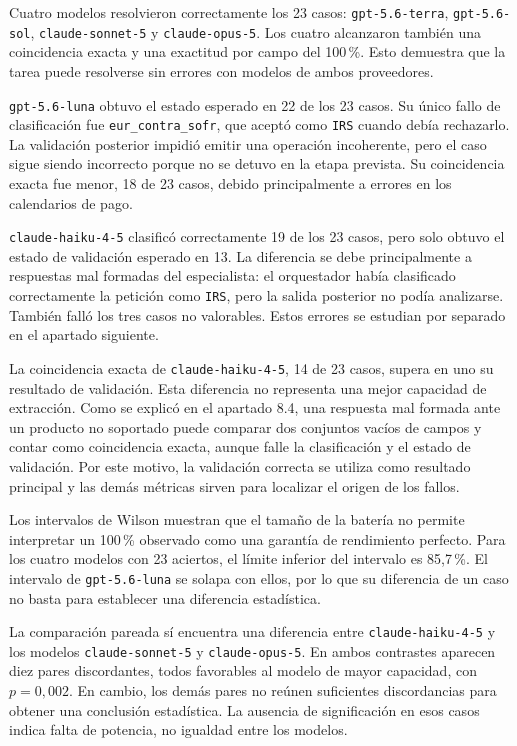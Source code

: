 Cuatro modelos resolvieron correctamente los 23 casos: \texttt{gpt-5.6-terra}, \texttt{gpt-5.6-sol}, \texttt{claude-sonnet-5} y \texttt{claude-opus-5}. Los cuatro alcanzaron también una coincidencia exacta y una exactitud por campo del 100\,\%. Esto demuestra que la tarea puede resolverse sin errores con modelos de ambos proveedores.

\texttt{gpt-5.6-luna} obtuvo el estado esperado en 22 de los 23 casos. Su único fallo de clasificación fue \texttt{eur\_contra\_sofr}, que aceptó como \texttt{IRS} cuando debía rechazarlo. La validación posterior impidió emitir una operación incoherente, pero el caso sigue siendo incorrecto porque no se detuvo en la etapa prevista. Su coincidencia exacta fue menor, 18 de 23 casos, debido principalmente a errores en los calendarios de pago.

\texttt{claude-haiku-4-5} clasificó correctamente 19 de los 23 casos, pero solo obtuvo el estado de validación esperado en 13. La diferencia se debe principalmente a respuestas mal formadas del especialista: el orquestador había clasificado correctamente la petición como \texttt{IRS}, pero la salida posterior no podía analizarse. También falló los tres casos no valorables. Estos errores se estudian por separado en el apartado siguiente.

La coincidencia exacta de \texttt{claude-haiku-4-5}, 14 de 23 casos, supera en uno su resultado de validación. Esta diferencia no representa una mejor capacidad de extracción. Como se explicó en el apartado 8.4, una respuesta mal formada ante un producto no soportado puede comparar dos conjuntos vacíos de campos y contar como coincidencia exacta, aunque falle la clasificación y el estado de validación. Por este motivo, la validación correcta se utiliza como resultado principal y las demás métricas sirven para localizar el origen de los fallos.

Los intervalos de Wilson muestran que el tamaño de la batería no permite interpretar un 100\,\% observado como una garantía de rendimiento perfecto. Para los cuatro modelos con 23 aciertos, el límite inferior del intervalo es 85,7\,\%. El intervalo de \texttt{gpt-5.6-luna} se solapa con ellos, por lo que su diferencia de un caso no basta para establecer una diferencia estadística.

La comparación pareada sí encuentra una diferencia entre \texttt{claude-haiku-4-5} y los modelos \texttt{claude-sonnet-5} y \texttt{claude-opus-5}. En ambos contrastes aparecen diez pares discordantes, todos favorables al modelo de mayor capacidad, con \(p=0{,}002\). En cambio, los demás pares no reúnen suficientes discordancias para obtener una conclusión estadística. La ausencia de significación en esos casos indica falta de potencia, no igualdad entre los modelos.

